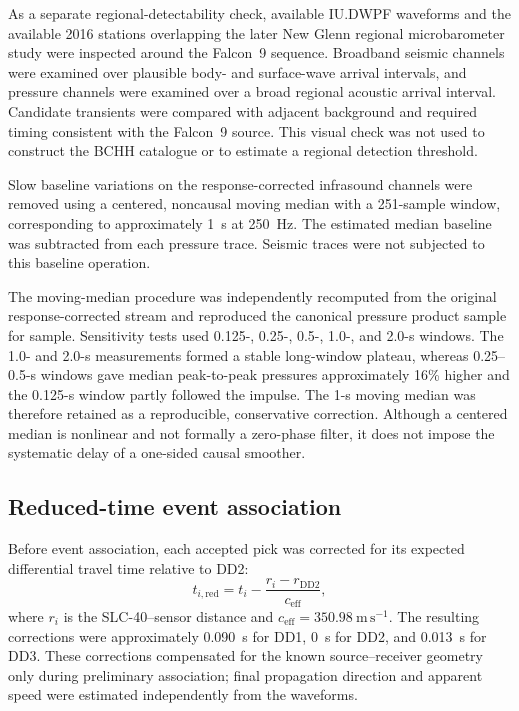 \documentclass[]{seismica}
\begin{document}
As a separate regional-detectability check, available IU.DWPF waveforms and
the available 2016 stations overlapping the later New Glenn regional
microbarometer study were inspected around the Falcon~9 sequence. Broadband
seismic channels were examined over plausible body- and surface-wave arrival
intervals, and pressure channels were examined over a broad regional acoustic
arrival interval. Candidate transients were compared with adjacent background
and required timing consistent with the Falcon~9 source. This visual check was
not used to construct the BCHH catalogue or to estimate a regional detection
threshold.

Slow baseline variations on the response-corrected infrasound channels were removed using a centered, noncausal moving median with a 251-sample window, corresponding to approximately 1~s at 250~Hz. The estimated median baseline was subtracted from each pressure trace. Seismic traces were not subjected to this baseline operation.

The moving-median procedure was independently recomputed from the original
response-corrected stream and reproduced the canonical pressure product sample
for sample. Sensitivity tests used 0.125-, 0.25-, 0.5-, 1.0-, and 2.0-s
windows. The 1.0- and 2.0-s measurements formed a stable long-window plateau,
whereas 0.25--0.5-s windows gave median peak-to-peak pressures approximately
16\% higher and the 0.125-s window partly followed the impulse. The 1-s moving
median was therefore retained as a reproducible, conservative correction.
Although a centered median is nonlinear and not formally a zero-phase filter,
it does not impose the systematic delay of a one-sided causal smoother.

\subsection{Reduced-time event association}

Before event association, each accepted pick was corrected for its expected differential travel time relative to DD2:
\begin{equation}
  t_{i,\mathrm{red}} = t_i - \frac{r_i-r_{\mathrm{DD2}}}{c_{\mathrm{eff}}},
  \label{eq:reduced_time}
\end{equation}
where $r_i$ is the SLC-40--sensor distance and $c_{\mathrm{eff}}=350.98~\mathrm{m\,s^{-1}}$. The resulting corrections were approximately 0.090~s for DD1, 0~s for DD2, and 0.013~s for DD3. These corrections compensated for the known source--receiver geometry only during preliminary association; final propagation direction and apparent speed were estimated independently from the waveforms.
\end{document}
